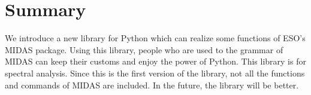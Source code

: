 	  \section{Summary}
We introduce a new library for Python which can realize some functions of ESO's MIDAS package. Using this library, people who are used to the grammar of MIDAS can keep their customs and enjoy the power of Python. This library is for spectral analysis. Since this is the first version of the library, not all the functions and commands of MIDAS are included. In the future, the library will be better.



